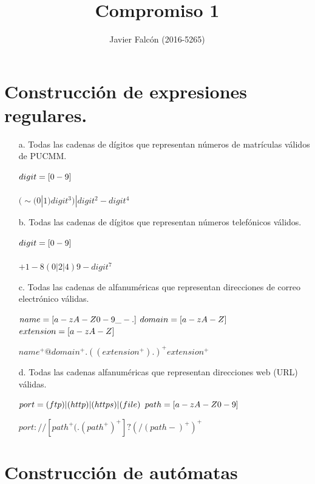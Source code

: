 \documentclass[a4paper,12pt]{article}
\title{Compromiso 1}
\author{Javier Falc\'on (2016-5265)}
\begin{document}
\maketitle
\section{Construcción de expresiones regulares.}

\begin{itemize}

\item[a.] Todas las cadenas de dígitos que representan números de matrículas válidos de PUCMM.

$\\digit = [0-9]$\\\\
$(\sim(0|1)digit^3)|digit^2-digit^4$\\

\item[b.] Todas las cadenas de dígitos que representan números telefónicos válidos.

$\\digit = [0-9]$\\\\
$+1-8(0|2|4)9-digit^7$

\item[c.] Todas las cadenas de alfanuméricas que representan direcciones de correo electrónico válidas.

$\\name = [a-zA-Z0-9\_-.]$ 
$\\domain = [a-zA-Z]$
$\\extension = [a-zA-Z]$

$name^+@domain^+.((extension^+).)^+extension^+$

\item[d.] Todas las cadenas alfanuméricas que representan direcciones web (URL) válidas.

$\\port = (ftp)|(http)|(https)|(file)$ 
$\\path = [a-zA-Z0-9]$

$port://[path^+(.(path^+)^+]?(/(path-)^+)^+$

\end{itemize}

\section{Construcción de autómatas}
\end{document}
